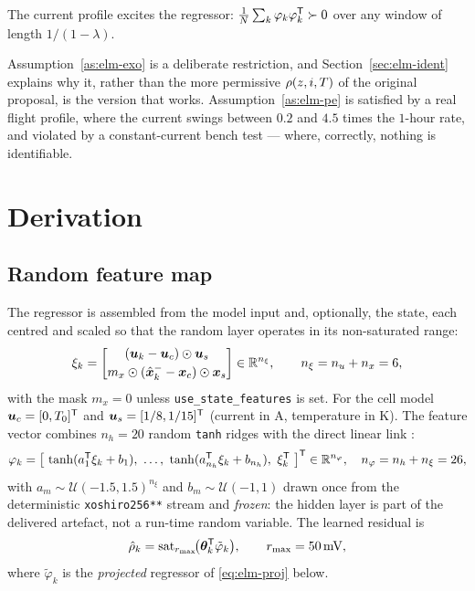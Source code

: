\begin{assumption}\label{as:elm-pe}
The current profile excites the regressor: $\frac{1}{N}\sum_k \varphi_k\varphi_k^{\mathsf{T}} \succ 0$ over
any window of length $1/(1-\lambda)$.
\end{assumption}

Assumption~\ref{as:elm-exo} is a deliberate restriction, and Section~\ref{sec:elm-ident} explains
why it, rather than the more permissive $\rho(z,i,T)$ of the original proposal, is the version
that works.  Assumption~\ref{as:elm-pe} is satisfied by a real flight profile, where the current
swings between $0.2$ and $4.5$ times the $1$-hour rate, and violated by a constant-current
bench test --- where, correctly, nothing is identifiable.

\section{Derivation}

\subsection{Random feature map}
The regressor is assembled from the model input and, optionally, the state, each centred and scaled
so that the random layer operates in its non-saturated range:
\begin{equation}\label{eq:elm-xi}
\xi_k = \begin{bmatrix} (\bm{u}_k - \bm{u}_c)\odot \bm{u}_s \\[2pt]
                        m_x \odot (\hat{\bm{x}}^{-}_k - \bm{x}_c)\odot \bm{x}_s \end{bmatrix}\in\mathbb{R}^{n_\xi},
\qquad n_\xi = n_u + n_x = 6,
\end{equation}
with the mask $m_x = 0$ unless \texttt{use\_state\_features} is set.  For the cell model
$\bm{u}_c = [0, T_0]^{\mathsf{T}}$ and $\bm{u}_s = [1/8, 1/15]^{\mathsf{T}}$ (current in \si{\ampere}, temperature in
\si{\kelvin}).  The feature vector combines $n_h = 20$ random \texttt{tanh} ridges with the direct
linear link \citep{pao1994rvfl}:
\begin{equation}\label{eq:elm-phi}
\varphi_k = \bigl[\ \tanh(a_1^\T\xi_k + b_1),\ \dots,\ \tanh(a_{n_h}^\T\xi_k + b_{n_h}),\ \xi_k^\T\ \bigr]^\T
\in\real^{n_\varphi},\quad n_\varphi = n_h + n_\xi = 26,
\end{equation}
with $a_m\sim\mathcal{U}(-\num{1.5},\num{1.5})^{n_\xi}$ and $b_m\sim\mathcal{U}(-1,1)$ drawn once
from the deterministic \texttt{xoshiro256**} stream \citep{blackman2021xoshiro} and \emph{frozen}:
the hidden layer is part of the delivered artefact, not a run-time random variable.  The learned
residual is
\begin{equation}\label{eq:elm-rho}
\hat\rho_k = \operatorname{sat}_{r_{\max}}\!\bigl(\bm{\theta}_k^{\mathsf{T}}\tilde\varphi_k\bigr),
\qquad r_{\max} = \SI{50}{\milli\volt},
\end{equation}
where $\tilde\varphi_k$ is the \emph{projected} regressor of \cref{eq:elm-proj} below.

